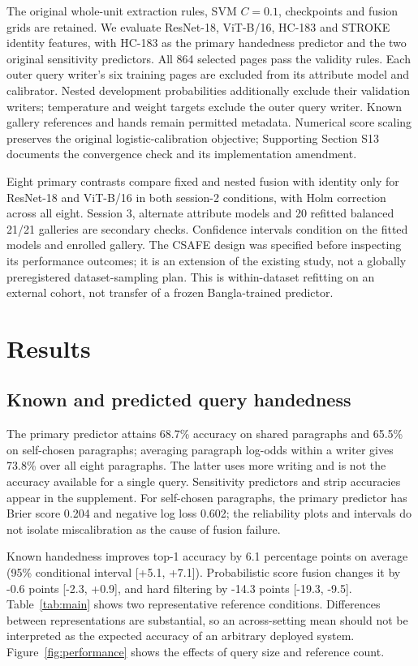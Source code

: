 \documentclass[ASNA,twocolumn]{USG}
\begin{document}
The original whole-unit extraction rules, SVM $C=0.1$, checkpoints and fusion grids are retained. We evaluate ResNet-18, ViT-B/16, HC-183 and STROKE identity features, with HC-183 as the primary handedness predictor and the two original sensitivity predictors. All 864 selected pages pass the validity rules. Each outer query writer's six training pages are excluded from its attribute model and calibrator. Nested development probabilities additionally exclude their validation writers; temperature and weight targets exclude the outer query writer. Known gallery references and hands remain permitted metadata. Numerical score scaling preserves the original logistic-calibration objective; Supporting Section S13 documents the convergence check and its implementation amendment.

Eight primary contrasts compare fixed and nested fusion with identity only for ResNet-18 and ViT-B/16 in both session-2 conditions, with Holm correction across all eight. Session 3, alternate attribute models and 20 refitted balanced 21/21 galleries are secondary checks. Confidence intervals condition on the fitted models and enrolled gallery. The CSAFE design was specified before inspecting its performance outcomes; it is an extension of the existing study, not a globally preregistered dataset-sampling plan. This is within-dataset refitting on an external cohort, not transfer of a frozen Bangla-trained predictor.

\section{Results}
\subsection{Known and predicted query handedness}
The primary predictor attains 68.7\% accuracy on shared paragraphs and 65.5\% on self-chosen paragraphs; averaging paragraph log-odds within a writer gives 73.8\% over all eight paragraphs. The latter uses more writing and is not the accuracy available for a single query. Sensitivity predictors and strip accuracies appear in the supplement. For self-chosen paragraphs, the primary predictor has Brier score 0.204 and negative log loss 0.602; the reliability plots and intervals do not isolate miscalibration as the cause of fusion failure.

Known handedness improves top-1 accuracy by 6.1 percentage points on average (95\% conditional interval [+5.1, +7.1]). Probabilistic score fusion changes it by -0.6 points [-2.3, +0.9], and hard filtering by -14.3 points [-19.3, -9.5]. Table~\ref{tab:main} shows two representative reference conditions. Differences between representations are substantial, so an across-setting mean should not be interpreted as the expected accuracy of an arbitrary deployed system. Figure~\ref{fig:performance} shows the effects of query size and reference count.
\end{document}
